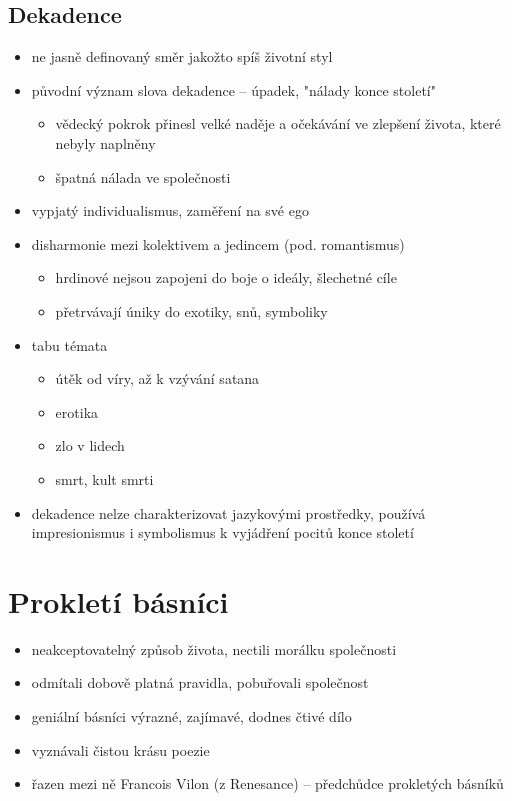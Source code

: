 \subsection{Dekadence}
\begin{itemize}
\item ne jasně definovaný směr jakožto spíš životní styl
\item původní význam slova dekadence -- úpadek, "nálady konce století" 
	\begin{itemize}
	\item vědecký pokrok přinesl velké naděje a očekávání ve zlepšení života, které nebyly naplněny
	\item[\ra] špatná nálada ve společnosti
	\end{itemize}
\item vypjatý individualismus, zaměření na své ego
\item disharmonie mezi kolektivem a jedincem (pod. romantismus)
	\begin{itemize}
	\item hrdinové nejsou zapojeni do boje o ideály, šlechetné cíle
	\item přetrvávají úniky do exotiky, snů, symboliky
	\end{itemize}
\item tabu témata
	\begin{itemize}
	\item útěk od víry, až k vzývání satana
	\item erotika
	\item zlo v lidech
	\item smrt, kult smrti
	\end{itemize}
\item dekadence nelze charakterizovat jazykovými prostředky, používá impresionismus i symbolismus k vyjádření pocitů konce století
\end{itemize}

\section{Prokletí básníci}
\begin{itemize}
\item neakceptovatelný způsob života, nectili morálku společnosti
\item odmítali dobově platná pravidla, pobuřovali společnost
\item geniální básníci \ra výrazné, zajímavé, dodnes čtivé dílo
\item vyznávali čistou krásu poezie
\item řazen mezi ně Francois Vilon (z Renesance) -- předchůdce prokletých básníků
\end{itemize}

